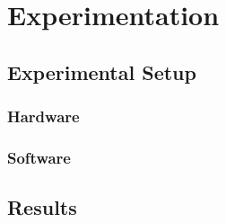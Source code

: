 \section{\label{sec-EX}Experimentation}
  \subsection{Experimental Setup}
    \subsubsection{Hardware}
    \subsubsection{Software}
  \subsection{Results}
